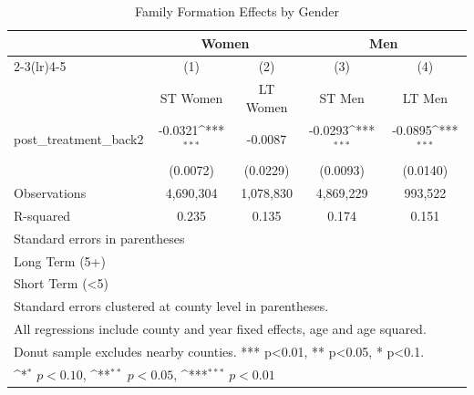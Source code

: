 \begin{table}[htbp]\centering
\def\sym#1{\ifmmode^{#1}\else\(^{#1}\)\fi}
\caption{Family Formation Effects by Gender}
\begin{tabular}{l*{4}{c}}
\hline\hline
            &\multicolumn{2}{c}{Women}                  &\multicolumn{2}{c}{Men}                    \\\cmidrule(lr){2-3}\cmidrule(lr){4-5}
            &\multicolumn{1}{c}{(1)}&\multicolumn{1}{c}{(2)}&\multicolumn{1}{c}{(3)}&\multicolumn{1}{c}{(4)}\\
            &\multicolumn{1}{c}{ST Women}&\multicolumn{1}{c}{LT Women}&\multicolumn{1}{c}{ST Men}&\multicolumn{1}{c}{LT Men}\\
\hline
post\_treatment\_back2&     -0.0321\sym{***}&     -0.0087         &     -0.0293\sym{***}&     -0.0895\sym{***}\\
            &    (0.0072)         &    (0.0229)         &    (0.0093)         &    (0.0140)         \\
\hline
Observations&   4,690,304         &   1,078,830         &   4,869,229         &     993,522         \\
R-squared   &       0.235         &       0.135         &       0.174         &       0.151         \\
\hline\hline
\multicolumn{5}{l}{\footnotesize Standard errors in parentheses}\\
\multicolumn{5}{l}{\footnotesize Long Term (5+)}\\
\multicolumn{5}{l}{\footnotesize Short Term (<5)}\\
\multicolumn{5}{l}{\footnotesize Standard errors clustered at county level in parentheses.}\\
\multicolumn{5}{l}{\footnotesize All regressions include county and year fixed effects, age and age squared.}\\
\multicolumn{5}{l}{\footnotesize Donut sample excludes nearby counties. *** p<0.01, ** p<0.05, * p<0.1.}\\
\multicolumn{5}{l}{\footnotesize \sym{*} \(p<0.10\), \sym{**} \(p<0.05\), \sym{***} \(p<0.01\)}\\
\end{tabular}
\end{table}
